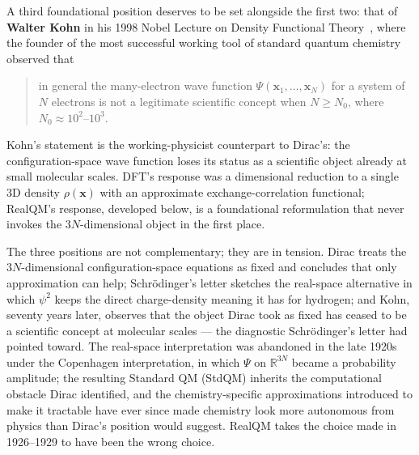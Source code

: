 \documentclass[11pt]{article}
\begin{document}
A third foundational position deserves to be set alongside the first two: that of \textbf{Walter Kohn} in his 1998 Nobel Lecture on Density Functional Theory~\cite{Kohn1998Nobel}, where the founder of the most successful working tool of standard quantum chemistry observed that
\begin{quote}
in general the many-electron wave function $\Psi(\mathbf{x}_1, \ldots, \mathbf{x}_N)$ for a system of $N$ electrons is not a legitimate scientific concept when $N \geq N_0$, where $N_0 \approx 10^2$--$10^3$.
\end{quote}
Kohn's statement is the working-physicist counterpart to Dirac's: the configuration-space wave function loses its status as a scientific object already at small molecular scales. DFT's response was a dimensional reduction to a single 3D density $\rho(\mathbf{x})$ with an approximate exchange-correlation functional; RealQM's response, developed below, is a foundational reformulation that never invokes the $3N$-dimensional object in the first place.

The three positions are not complementary; they are in tension. Dirac treats the $3N$-dimensional configuration-space equations as fixed and concludes that only approximation can help; Schr\"odinger's letter sketches the real-space alternative in which $\psi^2$ keeps the direct charge-density meaning it has for hydrogen; and Kohn, seventy years later, observes that the object Dirac took as fixed has ceased to be a scientific concept at molecular scales --- the diagnostic Schr\"odinger's letter had pointed toward. The real-space interpretation was abandoned in the late 1920s under the Copenhagen interpretation, in which $\Psi$ on $\mathbb{R}^{3N}$ became a probability amplitude; the resulting Standard QM (StdQM) inherits the computational obstacle Dirac identified, and the chemistry-specific approximations introduced to make it tractable have ever since made chemistry look more autonomous from physics than Dirac's position would suggest. RealQM takes the choice made in 1926--1929 to have been the wrong choice.
\end{document}
